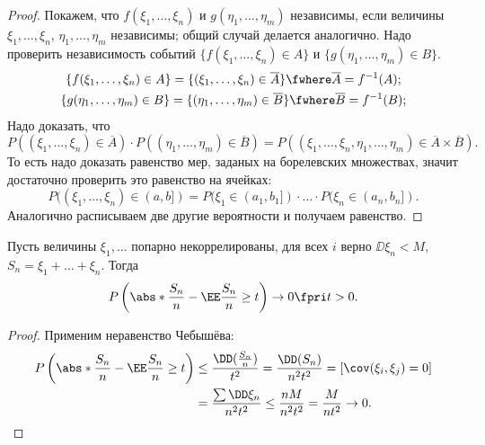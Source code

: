  \begin{proof} Покажем, что $f(\xi_1, \ldots, \xi_n)$ и $g(\eta_1, \ldots, \eta_m)$ независимы, если величины $\xi_1, \ldots, \xi_n$, $\eta_1, \ldots, \eta_m$ независимы; общий случай делается аналогично.
     Надо проверить независимость событий $\{f(\xi_1, \ldots, \xi_n)\in A\}$ и $\{g(\eta_1, \ldots, \eta_m)\in B\}$.
    \begin{gather*}
        \{f(\xi_1, \ldots, \xi_n)\in A\} = \{(\xi_1, \ldots, \xi_n)\in \overline{A}\}\fwhere \overline{A} = f^{-1}(A); \\
        \{g(\eta_1, \ldots, \eta_m)\in B\} = \{(\eta_1, \ldots, \eta_m)\in \overline{B}\} \fwhere \overline{B} = f^{-1}(B);\\
        \end{gather*}
        Надо доказать, что
       $$ P((\xi_1,\ldots, \xi_n)\in \overline{A})\cdot P((\eta_1, \ldots, \eta_m)\in\overline{B}) = P((\xi_1, \ldots, \xi_n, \eta_1, \ldots, \eta_m)\in \overline{A}\times\overline{B}).$$
     То есть надо доказать равенство мер, заданых на борелевских множествах, значит достаточно проверить это равенство на ячейках:
     $$P((\xi_1, \ldots, \xi_n)\in (a, b]) = P(\xi_1\in(a_1, b_1])\cdot\ldots\cdot P(\xi_n\in (a_n, b_n]).$$
    Аналогично расписываем две другие вероятности и получаем равенство. 
 \end{proof}

 \begin{theorem} Пусть величины
     $\xi_1, \ldots$ попарно некоррелированы, для всех $i$ верно
     $\DD\xi_n < M$, $S_n = \xi_1 + \ldots + \xi_n$. Тогда 
     $$P\left(\abs*{\frac{S_n}{n} - \EE \frac{S_n}{n}}\ge t\right)\rightarrow 0\fpri t > 0.$$
 \end{theorem}

 \begin{proof}
    Применим неравенство Чебышёва:
    \begin{align*}
        P\left(\abs*{\frac{S_n}{n} - \EE \frac{S_n}{n}}\ge t\right) &\le  \frac{\DD(\frac{S_n}{n})}{t^2} = \frac{\DD(S_n)}{n^2t^2} = [\cov(\xi_i, \xi_j)=0] \\&=  \frac{\sum\DD\xi_n}{n^2t^2} \le \frac{nM}{n^2t^2} = \frac{M}{nt^2}\rightarrow 0.
    \end{align*}
     
 \end{proof}

